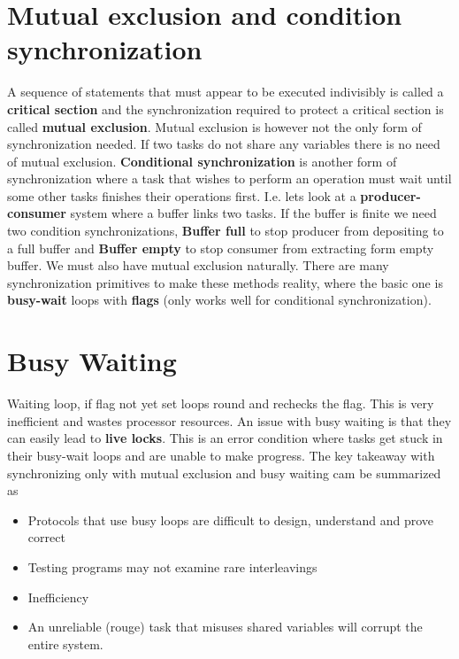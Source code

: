 \section{Mutual exclusion and condition synchronization}
A sequence of statements that must appear to be executed indivisibly is called a \textbf{critical section} and the synchronization required to protect a critical section is called \textbf{mutual exclusion}. Mutual exclusion is however not the only form of synchronization needed. If two tasks do not share any variables there is no need of mutual exclusion. \textbf{Conditional synchronization} is another form of synchronization where a task that wishes to perform an operation must wait until some other tasks finishes their operations first. 
I.e. lets look at a \textbf{producer-consumer} system where a buffer links two tasks. If the buffer is finite we need two condition synchronizations, \textbf{Buffer full} to stop producer from depositing to a full buffer and \textbf{Buffer empty} to stop consumer from extracting form empty buffer. We must also have mutual exclusion naturally. There are many synchronization primitives to make these methods reality, where the basic one is \textbf{busy-wait} loops with \textbf{flags} (only works well for conditional synchronization).

\section{Busy Waiting}
Waiting loop, if flag not yet set loops round and rechecks the flag. This is very inefficient and wastes processor resources. An issue with busy waiting is that they can easily lead to \textbf{live locks}. This is an error condition where tasks get stuck in their busy-wait loops and are unable to make progress. The key takeaway with synchronizing only with mutual exclusion and busy waiting cam be summarized as
\begin{itemize}
\item Protocols that use busy loops are difficult to design, understand and prove correct
\item Testing programs may not examine rare interleavings
\item Inefficiency
\item An unreliable (rouge) task that misuses shared variables will corrupt the entire system.
\end{itemize}

